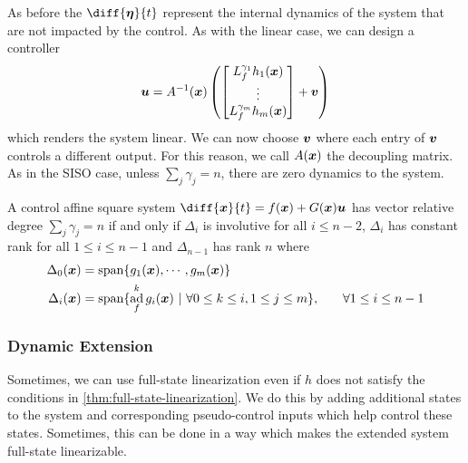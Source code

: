 As before the $\diff{\bs{\eta}}{t}$ represent the internal dynamics of the
system that are not impacted by the control. As with the linear case, we can
design a controller \[
	\boldsymbol{u} = A^{-1}(\boldsymbol{x})\left(
	\begin{bmatrix}
		L_f^{\gamma_1}h_1(\boldsymbol{x})\\
		\vdots\\
		L_f^{\gamma_m}h_m(\boldsymbol{x})\\
	\end{bmatrix} + \boldsymbol{v}\right)
\]
which renders the system linear. We can now choose $\boldsymbol{v}$ where each entry of
$\boldsymbol{v}$ controls a different output. For this reason, we call $A(\boldsymbol{x})$ the
decoupling matrix. As in the SISO case, unless $\sum_j \gamma_j = n$, there are
zero dynamics to the system.
\begin{theorem}
	A control affine square system $\diff{\bs{x}}{t} = f(\bs{x}) +
	G(\bs{x})\bs{u}$ has vector relative degree $\sum_j \gamma_j = n$ if and only
	if $\Delta_i$ is involutive for all $i \leq n-2$, $\Delta_i$ has constant rank
	for all $1 \leq i \leq n-1$ and $\Delta_{n-1}$ has rank $n$ where \[
		\begin{aligned}
			\Delta_0(\bs{x}) &= \text{span}\{g_1(\bs{x}),\cdots,g_m(\bs{x})\}\\
			\Delta_i(\bs{x}) &= \text{span}\{\ad_f^kg_i(\bs{x})\ |\  \forall 0 \leq k \leq i,
			1 \leq j \leq m\}, &\quad \forall 1 \leq i \leq n-1
		\end{aligned}
	\]
	\label{thm:full-state-linearization-mimo}
\end{theorem}
\subsubsection{Dynamic Extension}
Sometimes, we can use full-state linearization even if $h$ does not satisfy the
conditions in \cref{thm:full-state-linearization}. We do this by adding
additional states to the system and corresponding pseudo-control inputs which
help control these states. Sometimes, this can be done in a way which makes the
extended system full-state linearizable.
